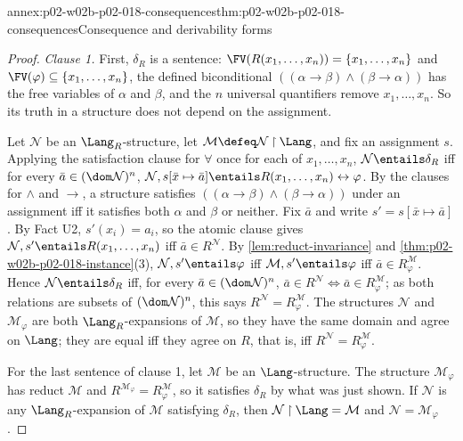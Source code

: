 \begin{annexitem}{annex:p02-w02b-p02-018-consequences}{thm:p02-w02b-p02-018-consequences}{Consequence and derivability forms}
\begin{proof}
\emph{Clause 1.}  First, \(\delta_R\) is a sentence:
\(\FV(R(x_1,\ldots,x_n))=\{x_1,\ldots,x_n\}\) and
\(\FV(\varphi)\subseteq\{x_1,\ldots,x_n\}\), the defined biconditional
\(((\alpha\to\beta)\land(\beta\to\alpha))\) has the free variables of
\(\alpha\) and \(\beta\), and the \(n\) universal quantifiers remove
\(x_1,\ldots,x_n\).  So its truth in a structure does not depend on the
assignment.

Let \(\mathcal N\) be an \(\Lang_R\)-structure, let
\(\mathcal M\defeq\mathcal N\mathbin{\upharpoonright}\Lang\), and fix an
assignment \(s\).  Applying the satisfaction clause for \(\forall\) once for
each of \(x_1,\ldots,x_n\), \(\mathcal N\entails\delta_R\) iff for every
\(\bar a\in(\dom\mathcal N)^n\),
\(\mathcal N,s[\bar x\mapsto\bar a]\entails
R(x_1,\ldots,x_n)\leftrightarrow\varphi\).  By the clauses for \(\land\) and
\(\to\), a structure satisfies \(((\alpha\to\beta)\land(\beta\to\alpha))\)
under an assignment iff it satisfies both \(\alpha\) and \(\beta\) or
neither.  Fix \(\bar a\) and write \(s'=s[\bar x\mapsto\bar a]\).  By Fact
U2, \(s'(x_i)=a_i\), so the atomic clause gives
\(\mathcal N,s'\entails R(x_1,\ldots,x_n)\) iff \(\bar a\in R^{\mathcal N}\).
By \cref{lem:reduct-invariance} and
\cref{thm:p02-w02b-p02-018-instance}(3),
\(\mathcal N,s'\entails\varphi\) iff \(\mathcal M,s'\entails\varphi\) iff
\(\bar a\in R^{\mathcal M}_{\varphi}\).  Hence \(\mathcal N\entails\delta_R\)
iff, for every \(\bar a\in(\dom\mathcal N)^n\),
\(\bar a\in R^{\mathcal N}\Leftrightarrow\bar a\in R^{\mathcal M}_{\varphi}\);
as both relations are subsets of \((\dom\mathcal N)^n\), this says
\(R^{\mathcal N}=R^{\mathcal M}_{\varphi}\).  The structures \(\mathcal N\)
and \(\mathcal M_{\varphi}\) are both \(\Lang_R\)-expansions of
\(\mathcal M\), so they have the same domain and agree on \(\Lang\); they
are equal iff they agree on \(R\), that is, iff
\(R^{\mathcal N}=R^{\mathcal M}_{\varphi}\).

For the last sentence of clause 1, let \(\mathcal M\) be an
\(\Lang\)-structure.  The structure \(\mathcal M_{\varphi}\) has reduct
\(\mathcal M\) and \(R^{\mathcal M_{\varphi}}=R^{\mathcal M}_{\varphi}\), so
it satisfies \(\delta_R\) by what was just shown.  If \(\mathcal N\) is any
\(\Lang_R\)-expansion of \(\mathcal M\) satisfying \(\delta_R\), then
\(\mathcal N\mathbin{\upharpoonright}\Lang=\mathcal M\) and
\(\mathcal N=\mathcal M_{\varphi}\).


\end{proof}
\end{annexitem}
